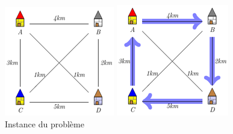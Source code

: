\documentclass[12pt]{report}
\begin{document}
\begin{figure}[!htb]
  \includegraphics[width=\linewidth]{img/pb1}
  \caption{Instance du problème}\label{fig:pb1}
\endminipage\hfill
{}
  \includegraphics[width=\linewidth]{img/pb2}

\end{figure}
\end{document}

